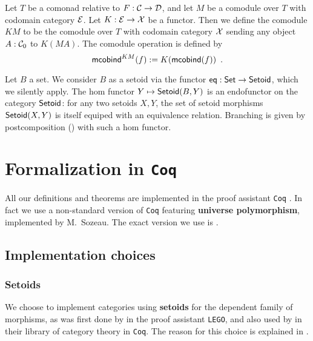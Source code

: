 \documentclass{amsart}
\newcommand{\fat}[1]{\textbf{#1}}
\begin{document}
\begin{definition}\label{def:postcomposition_functor}
  Let $T$ be a comonad relative to $F:{\mathcal{C}}\to\mathcal{D}$, and let $M$ be a comodule over $T$ with codomain category $\mathcal{E}$.
 Let $K : \mathcal{E} \to \mathcal{X}$ be a functor. Then we define the comodule $KM$ to be the comodule over $T$ with codomain category $\mathcal{X}$
  sending any object $A:{\mathcal{C}}_0$ to $K(MA)$.
  The comodule operation is defined by
  \[ \mathsf{mcobind}^{KM}(f) := K (\mathsf{mcobind}(f)) \enspace . 
  \]
\end{definition}

\begin{example}
  Let $B$ a set. We consider $B$ as a setoid via the functor $\mathsf{eq}:\mathsf{Set}\to\mathsf{Setoid}$, which we silently apply.
  The hom functor $Y \mapsto \mathsf{Setoid}(B,Y)$ is an endofunctor on the category $\mathsf{Setoid}$: for any two setoids $X,Y$, 
   the set of setoid morphisms $\mathsf{Setoid}(X,Y)$ is itself equiped with an equivalence relation.
   Branching is given by postcomposition () with such a hom functor.
\end{example}





\section{Formalization in \texttt{Coq}}\label{sec:formal}

All our definitions and theorems are implemented in the proof assistant \texttt{Coq} \parencite{coq}.
In fact we use a non-standard version of \texttt{Coq} featuring \fat{universe polymorphism}, implemented by 
M.\ Sozeau.
The exact version we use is \parencite{coq_polymorphic}.

\subsection{Implementation choices}


\subsubsection{Setoids}

We choose to implement categories using \fat{setoids} for the dependent family of morphisms, as was first done by
\textcite{aczel_galois} in the proof assistant \texttt{LEGO}, and also used by \textcite{concat} in their library
of category theory in \texttt{Coq}.
The reason for this choice is explained in \parencite[Sec.\ 3.1.2]{ahrens_zsido}.
\end{document}
